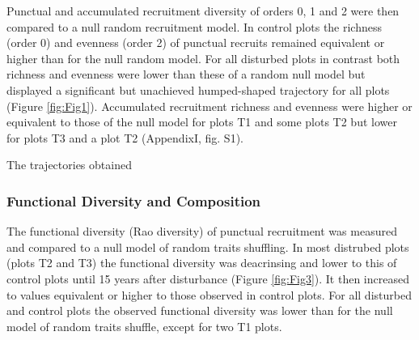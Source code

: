 \documentclass[fleqn,10pt]{ArtEcoFoG} %
\begin{document}
Punctual and accumulated recruitment diversity of orders 0, 1 and 2 were
then compared to a null random recruitment model. In control plots the
richness (order 0) and evenness (order 2) of punctual recruits remained
equivalent or higher than for the null random model. For all disturbed
plots in contrast both richness and evenness were lower than these of a
random null model but displayed a significant but unachieved
humped-shaped trajectory for all plots (Figure \ref{fig:Fig1}).
Accumulated recruitment richness and evenness were higher or equivalent
to those of the null model for plots T1 and some plots T2 but lower for
plots T3 and a plot T2 (AppendixI, fig. S1).

The trajectories obtained

\subsubsection{Functional Diversity and
Composition}\label{functional-diversity-and-composition}

The functional diversity (Rao diversity) of punctual recruitment was
measured and compared to a null model of random traits shuffling. In
most distrubed plots (plots T2 and T3) the functional diversity was
deacrinsing and lower to this of control plots until 15 years after
disturbance (Figure \ref{fig:Fig3}). It then increased to values
equivalent or higher to those observed in control plots. For all
disturbed and control plots the observed functional diversity was lower
than for the null model of random traits shuffle, except for two T1
plots.
\end{document}
